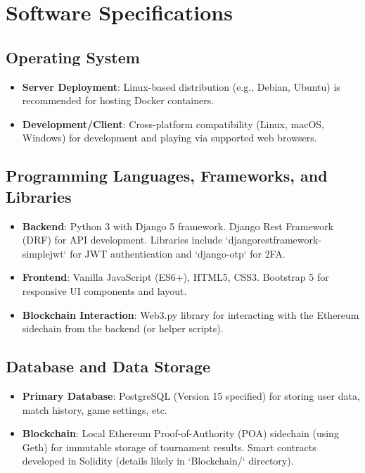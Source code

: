 \section*{Software Specifications}

\subsection*{Operating System}
\begin{itemize}
    \item \textbf{Server Deployment}: Linux-based distribution (e.g., Debian, Ubuntu) is recommended for hosting Docker containers.
    \item \textbf{Development/Client}: Cross-platform compatibility (Linux, macOS, Windows) for development and playing via supported web browsers.
\end{itemize}

\subsection*{Programming Languages, Frameworks, and Libraries}
\begin{itemize}
    \item \textbf{Backend}: Python 3 with Django 5 framework. Django Rest Framework (DRF) for API development. Libraries include `djangorestframework-simplejwt` for JWT authentication and `django-otp` for 2FA.
    \item \textbf{Frontend}: Vanilla JavaScript (ES6+), HTML5, CSS3. Bootstrap 5 for responsive UI components and layout.
    \item \textbf{Blockchain Interaction}: Web3.py library for interacting with the Ethereum sidechain from the backend (or helper scripts).
\end{itemize}

\subsection*{Database and Data Storage}
\begin{itemize}
    \item \textbf{Primary Database}: PostgreSQL (Version 15 specified) for storing user data, match history, game settings, etc.
    \item \textbf{Blockchain}: Local Ethereum Proof-of-Authority (POA) sidechain (using Geth) for immutable storage of tournament results. Smart contracts developed in Solidity (details likely in `Blockchain/` directory).
\end{itemize}

